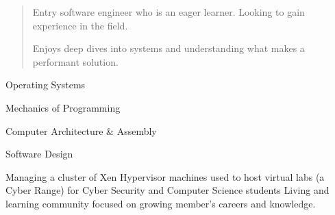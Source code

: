   \begin{quote}
    Entry software engineer who is an eager learner. Looking to gain experience in the field. \par
    Enjoys deep dives into systems and understanding what makes a performant solution.
  \end{quote}


  \smallskip{}

  \smallskip{}
  \cvtag{\LaTeX}
  
  Operating Systems \par
  Mechanics of Programming \par
  Computer Architecture \& Assembly \par
  Software Design


  Managing a cluster of Xen Hypervisor machines used to host virtual labs (a Cyber Range) for Cyber Security and Computer Science students
  Living and learning community focused on growing member's careers and knowledge.

